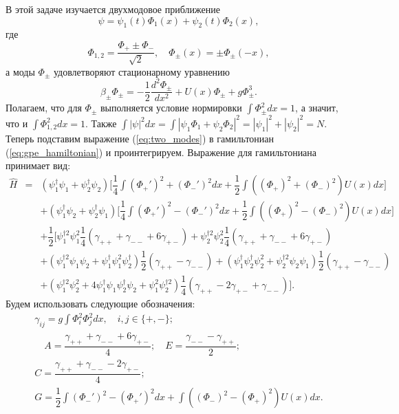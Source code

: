 \documentclass[12pt]{article}
\begin{document}
В этой задаче изучается двухмодовое приближение
%
\begin{equation}
\psi = \psi_1(t) \Phi_1(x) + \psi_2(t) \Phi_2(x),
\label{eq:two_modes}
\end{equation}
%
где
%
\begin{equation}
\Phi_{1,2} = \dfrac{\Phi_+ \pm \Phi_-}{\sqrt{2}}, \quad \Phi_{\pm}(x) = \pm \Phi_{\pm} (-x),
\label{eq:conditions}
\end{equation}
%
а моды $\Phi_{\pm}$ удовлетворяют стационарному уравнению
%
\begin{equation}
\beta_{\pm} \Phi_{\pm} = -\dfrac{1}{2} \dfrac{d^2 \Phi_{\pm}}{dx^2} + U(x) \Phi_{\pm} + g \Phi_{\pm}^3.
\label{eq:stationary}
\end{equation}
%
Полагаем, что для $\Phi_{\pm}$ выполняется условие нормировки $\int \Phi_{\pm}^2 dx = 1$, а значит, что и $\int \Phi_{1,2}^2 dx = 1$.
Также $\int |\psi|^2 dx = \int |\psi_1 \Phi_1 + \psi_2 \Phi_2|^2 = |\psi_1|^2 + |\psi_2|^2 = N$.
Теперь подставим выражение (\ref{eq:two_modes}) в гамильтониан (\ref{eq:gpe_hamiltonian}) и проинтегрируем.
Выражение для гамильтониана принимает вид:
%
\begin{eqnarray*}
\hat{H} & = & (\psi_1^\dag \psi_1 + \psi_2^\dag \psi_2) \Big[ \dfrac{1}{4} \int (\Phi_+')^2 + (\Phi_-')^2  dx + \dfrac{1}{2} \int ((\Phi_+)^2 + (\Phi_-)^2) U(x) dx \Big] \\[10pt]
&& +(\psi_1^\dag \psi_2 + \psi_2^\dag \psi_1) \Big[ \dfrac{1}{4} \int (\Phi_+')^2 - (\Phi_-')^2 dx + \dfrac{1}{2} \int ((\Phi_+)^2 - (\Phi_-)^2)U(x) dx \Big] \\[10pt]
&& +\dfrac{1}{2} \Big[ \psi_1^{\dag 2} \psi_1^2 \dfrac{1}{4} (\gamma_{++} + \gamma_{--} + 6 \gamma_{+-}) + \psi_2^{\dag 2} \psi_2^2 \dfrac{1}{4}(\gamma_{++} + \gamma_{--} + 6 \gamma_{+-})  \\[10pt]
&& +(\psi_1^{\dag 2} \psi_1 \psi_2 + \psi_1^\dag \psi_1^2 \psi_2^\dag) \dfrac{1}{2}(\gamma_{++} - \gamma_{--}) + (\psi_1^\dag \psi_2^\dag \psi_2^2 + \psi_2^{\dag 2} \psi_2 \psi_1) \dfrac{1}{2} (\gamma_{++} - \gamma_{--})\\[10pt]
&& + (\psi_1^{\dag 2} \psi_2^2 + 4 \psi_1^\dag \psi_1 \psi_2^\dag \psi_2 + \psi_1^2 \psi_2^{\dag 2}) \dfrac{1}{4} (\gamma_{++} - 2 \gamma_{+-} + \gamma_{--}) \Big].
\end{eqnarray*}
%
Будем использовать следующие обозначения:
%
\begin{equation}
\begin{array}{c}
	\gamma_{ij} = g \int \Phi_i^2 \Phi_j^2 dx, \quad i,j \in \{+,-\}; \\[10pt]
	\quad A = \dfrac{\gamma_{++} + \gamma_{--} + 6 \gamma_{+-}}{4}; \quad E = \dfrac{\gamma_{--} - \gamma_{++}}{2}; \\[10pt]
	C = \dfrac{\gamma_{++} + \gamma_{--} - 2\gamma_{+-}}{4}; \\[10pt]
	G = \dfrac{1}{2} \int (\Phi_-')^2 - (\Phi_+')^2 dx + \int ((\Phi_-)^2 - (\Phi_+)^2)U(x) dx.
\end{array}
\label{eq:subs}
\end{equation}
\end{document}
